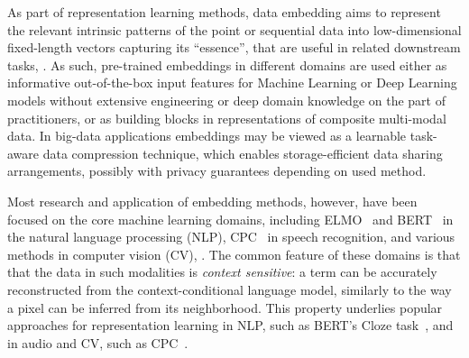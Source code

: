 \documentclass[sigconf, anonymous]{acmart}
\begin{document}


As part of representation learning methods, data embedding aims to represent the relevant
intrinsic patterns of the point or sequential data into low-dimensional fixed-length vectors
capturing its ``essence'', that are useful in related downstream tasks,%
\citep{Mikolov2013EfficientEO,Peters2018DeepCW,Devlin2019BERTPO,Doersch2015UnsupervisedVR,Oord2018RepresentationLW}.
As such, pre-trained embeddings in different domains are used either as informative
out-of-the-box input features for Machine Learning or Deep Learning models without extensive
engineering or deep domain knowledge on the part of practitioners, or as building blocks
in representations of composite multi-modal data. In big-data applications embeddings may
be viewed as a learnable task-aware data compression technique, which enables storage-efficient
data sharing arrangements, possibly with privacy guarantees depending on used method.

Most research and application of embedding methods, however, have been focused on the core
machine learning domains, including ELMO~\citep{Peters2018DeepCW} and BERT~\citep{Devlin2019BERTPO}
in the natural language processing (NLP), CPC~\citep{Oord2018RepresentationLW} in speech recognition,
and various methods in computer vision (CV), \citep{Doersch2015UnsupervisedVR, Oord2018RepresentationLW}.
%
The common feature of these domains is that that the data in such modalities is \emph{context
sensitive}: a term can be accurately reconstructed from the context-conditional language
model, similarly to the way a pixel can be inferred from its neighborhood. This property
underlies popular approaches for representation learning in NLP, such as BERT's Cloze
task~\citep{Devlin2019BERTPO}, and in audio and CV, such as CPC~\citep{Oord2018RepresentationLW}.
\end{document}
